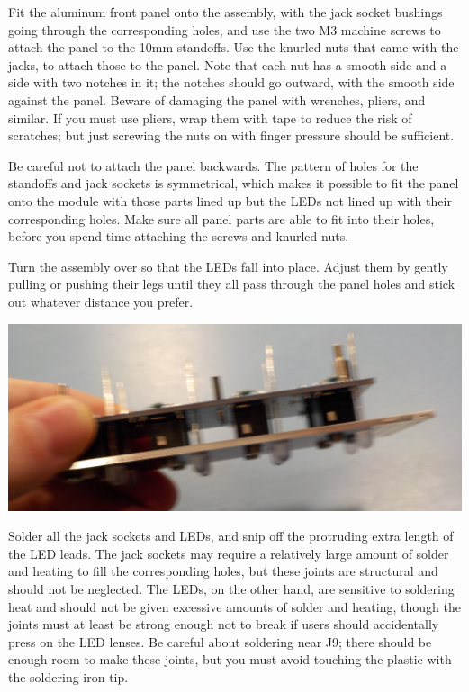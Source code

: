 Fit the aluminum front panel onto the assembly, with the jack socket
bushings going through the corresponding holes, and use the two M3 machine
screws to attach the panel to the 10mm standoffs.
Use the knurled nuts that came with the jacks, to attach those to the panel. 
Note that each nut has a smooth side and a side with two notches in it; the
notches should go outward, with the smooth side against the panel.
Beware of damaging the panel with wrenches, pliers, and similar.  If you
must use pliers, wrap them with tape to reduce the risk of scratches; but
just screwing the nuts on with finger pressure should be sufficient.

Be careful not to attach the panel backwards.  The pattern of holes for the
standoffs and jack sockets is symmetrical, which makes it possible to fit
the panel onto the module with those parts lined up but the LEDs not lined
up with their corresponding holes.  Make sure all panel parts are able to
fit into their holes, before you spend time attaching the screws and knurled
nuts.

Turn the assembly over so that the LEDs fall into place.  Adjust them by
gently pulling or pushing their legs until they all pass through the panel
holes and stick out whatever distance you prefer.

\noindent\includegraphics[width=\linewidth]{panel-stack.jpg}

Solder all the jack sockets and LEDs, and snip off the protruding extra
length of the LED leads.  The jack sockets may require a relatively large
amount of solder and heating to fill the corresponding holes, but these
joints are structural and should not be neglected.  The LEDs, on the other
hand, are sensitive to soldering heat and should not be given excessive
amounts of solder and heating, though the joints must at least be strong
enough not to break if users should accidentally press on the LED lenses. 
Be careful about soldering near J9; there should be enough room to make
these joints, but you must avoid touching the plastic with the soldering
iron tip.

